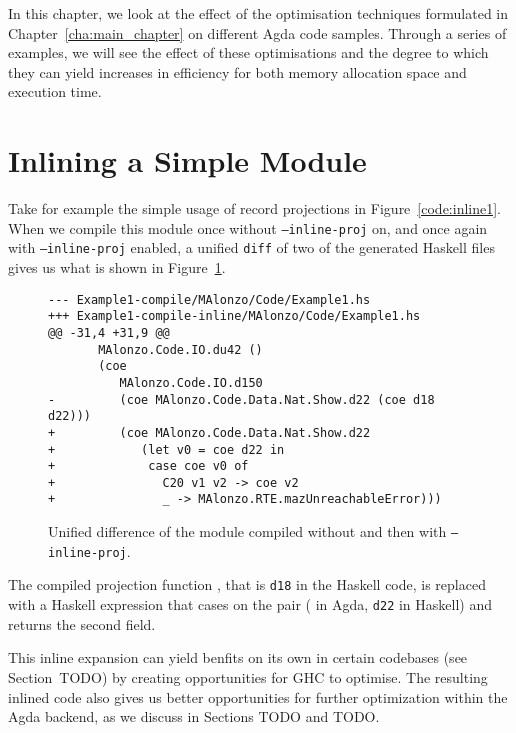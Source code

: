In this chapter, we look at the effect of the optimisation techniques formulated in Chapter~\ref{cha:main_chapter} on different Agda code samples. Through a series of examples, we will see the effect of these optimisations and the degree to which they can yield increases in efficiency for both memory allocation space and execution time.

\section{Inlining a Simple Module}



Take for example the simple usage of record projections in Figure~\ref{code:inline1}. When we compile this module once without \texttt{--inline-proj} on, and once again with \texttt{--inline-proj} enabled, a unified \texttt{diff} of two of the generated Haskell files gives us what is shown in Figure~\ref{fig:inline1_diff}.

\begin{figure}
\begin{verbatim}
--- Example1-compile/MAlonzo/Code/Example1.hs
+++ Example1-compile-inline/MAlonzo/Code/Example1.hs
@@ -31,4 +31,9 @@
       MAlonzo.Code.IO.du42 ()
       (coe
          MAlonzo.Code.IO.d150
-         (coe MAlonzo.Code.Data.Nat.Show.d22 (coe d18 d22)))
+         (coe MAlonzo.Code.Data.Nat.Show.d22
+            (let v0 = coe d22 in
+             case coe v0 of
+               C20 v1 v2 -> coe v2
+               _ -> MAlonzo.RTE.mazUnreachableError)))
\end{verbatim}

\caption{Unified difference of the  module compiled without and then with \texttt{--inline-proj}.}
\label{fig:inline1_diff}
\end{figure}

The compiled projection function , that is \lstinline{d18} in the Haskell code, is replaced with a Haskell expression that cases on the pair ( in Agda, \lstinline{d22} in Haskell) and returns the second field.

This inline expansion can yield benfits on its own in certain codebases (see Section~TODO) by creating opportunities for GHC to optimise. The resulting inlined code also gives us better opportunities for further optimization within the Agda backend, as we discuss in Sections TODO and TODO.

